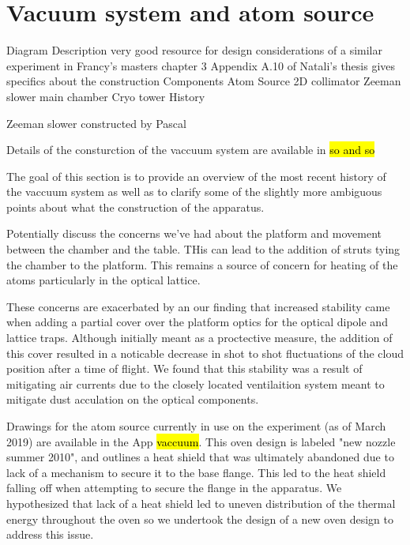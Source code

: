 \section{Vacuum system and atom source}
\label{sec:vac}

Diagram
Description
	very good resource for design considerations of a similar experiment in Francy's masters chapter 3
	Appendix A.10 of Natali's thesis gives specifics about the construction
Components
	Atom Source
	2D collimator
	Zeeman slower
	main chamber
	Cryo tower
History
	

	
Zeeman slower
	constructed by Pascal
	


Details of the consturction of the vaccuum system are available in \hl{so and so}

The goal of this section is to provide an overview of the most recent history of the vaccuum system as well as to clarify some of the slightly more ambiguous points about what the construction of the apparatus.

Potentially discuss the concerns we've had about the platform and movement between the chamber and the table. THis can lead to the addition of struts tying the chamber to the platform. This remains a source of concern for heating of the atoms particularly in the optical lattice. 

These concerns are exacerbated by an our finding that increased stability came when adding a partial cover over the platform optics for the optical dipole and lattice traps. Although initially meant as a proctective measure, the addition of this cover resulted in a noticable decrease in shot to shot fluctuations of the cloud position after a time of flight. We found that this stability was a result of mitigating air currents due to the closely located ventilaition system meant to mitigate dust acculation on the optical components.

Drawings for the atom source currently in use on the experiment (as of March 2019) are available in the App \hl{vaccuum}. This oven design is labeled "new nozzle summer 2010", and outlines a heat shield that was ultimately abandoned due to lack of a mechanism to secure it to the base flange. This led to the heat shield falling off when attempting to secure the flange in the apparatus. We hypothesized that lack of a heat shield led to uneven distribution of the thermal energy throughout the oven so we undertook the design of a new oven design to address this issue.

